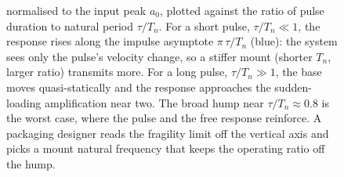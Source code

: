 \begin{figure}[htbp]
{normalised to the input peak $a_0$, plotted against the ratio of pulse
duration to natural period $\tau/T_n$. For a short pulse, $\tau/T_n\ll
1$, the response rises along the impulse asymptote $\pi\,\tau/T_n$
(blue): the system sees only the pulse's velocity change, so a stiffer
mount (shorter $T_n$, larger ratio) transmits more. For a long pulse,
$\tau/T_n\gg 1$, the base moves quasi-statically and the response
approaches the sudden-loading amplification near two. The broad hump
near $\tau/T_n\approx 0.8$ is the worst case, where the pulse and the
free response reinforce. A packaging designer reads the fragility limit
off the vertical axis and picks a mount natural frequency that keeps the
operating ratio off the hump.}
\label{fig:vol03ch06:shock-spectrum}
\end{figure}
